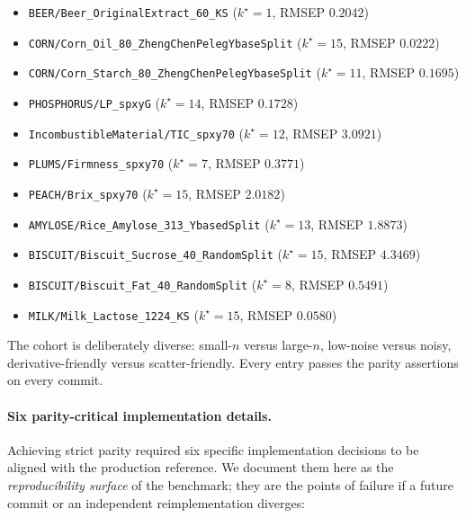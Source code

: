 \documentclass[review,a4paper]{elsarticle}
\begin{document}
\begin{itemize}[leftmargin=2em,itemsep=0pt]
  \item \texttt{BEER/Beer\_OriginalExtract\_60\_KS} ($k^\star{=}1$,
        RMSEP $0.2042$)
  \item \texttt{CORN/Corn\_Oil\_80\_ZhengChenPelegYbaseSplit}
        ($k^\star{=}15$, RMSEP $0.0222$)
  \item \texttt{CORN/Corn\_Starch\_80\_ZhengChenPelegYbaseSplit}
        ($k^\star{=}11$, RMSEP $0.1695$)
  \item \texttt{PHOSPHORUS/LP\_spxyG} ($k^\star{=}14$, RMSEP $0.1728$)
  \item \texttt{IncombustibleMaterial/TIC\_spxy70} ($k^\star{=}12$,
        RMSEP $3.0921$)
  \item \texttt{PLUMS/Firmness\_spxy70} ($k^\star{=}7$, RMSEP $0.3771$)
  \item \texttt{PEACH/Brix\_spxy70} ($k^\star{=}15$, RMSEP $2.0182$)
  \item \texttt{AMYLOSE/Rice\_Amylose\_313\_YbasedSplit}
        ($k^\star{=}13$, RMSEP $1.8873$)
  \item \texttt{BISCUIT/Biscuit\_Sucrose\_40\_RandomSplit}
        ($k^\star{=}15$, RMSEP $4.3469$)
  \item \texttt{BISCUIT/Biscuit\_Fat\_40\_RandomSplit} ($k^\star{=}8$,
        RMSEP $0.5491$)
  \item \texttt{MILK/Milk\_Lactose\_1224\_KS} ($k^\star{=}15$, RMSEP
        $0.0580$)
\end{itemize}

The cohort is deliberately diverse: small-$n$ versus large-$n$,
low-noise versus noisy, derivative-friendly versus scatter-friendly.
Every entry passes the parity assertions on every commit.

\paragraph{Six parity-critical implementation details.}
Achieving strict parity required six specific implementation decisions
to be aligned with the production reference. We document them here as
the \emph{reproducibility surface} of the benchmark; they are the
points of failure if a future commit or an independent reimplementation
diverges:
\end{document}
